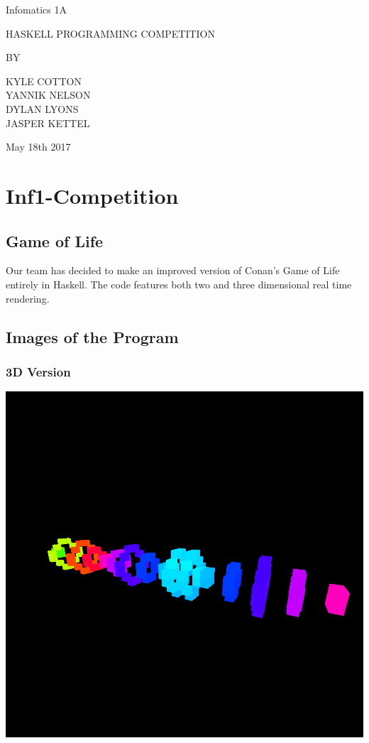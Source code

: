 \documentclass[11pt]{article}
\author{Kyle Cotton}
\date{\today}
\title{}
\begin{document}
\begin{titlepage}
\begin{center}
{\Large Infomatics 1A \par}
\vspace{2cm}
{\Large HASKELL PROGRAMMING COMPETITION \par}
\vspace{2cm}
BY \par
\vspace{2cm}
{\Large KYLE COTTON\\YANNIK NELSON\\DYLAN LYONS\\JASPER KETTEL \par}
\vspace{2cm}
{\large May 18th 2017}
\end{center}
\vfill
\end{titlepage}

\tableofcontents

\section{Inf1-Competition}
\label{sec:orged706b5}
\subsection{Game of Life}
\label{sec:orgc51cce5}
Our team has decided to make an improved version of Conan's Game of Life entirely in Haskell.
The code features both two and three dimensional real time rendering.

\subsection{Images of the Program}
\label{sec:org5a44caf}
\subsubsection{3D Version}
\label{sec:orgadd5f6b}

\begin{center}
\includegraphics[width=.9\linewidth]{img/1-3.png}
\end{center}
\end{document}
